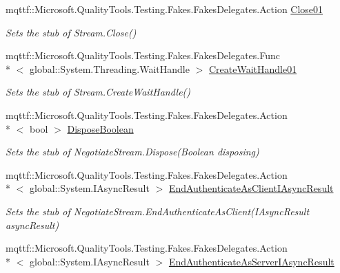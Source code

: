 \begin{DoxyCompactItemize}
mqttf\-::\-Microsoft.\-Quality\-Tools.\-Testing.\-Fakes.\-Fakes\-Delegates.\-Action \hyperlink{class_system_1_1_net_1_1_security_1_1_fakes_1_1_stub_negotiate_stream_a674e846a4fe168b20497d6c799c6b016}{Close01}
\begin{DoxyCompactList}\small\item\em Sets the stub of Stream.\-Close()\end{DoxyCompactList}\item 
mqttf\-::\-Microsoft.\-Quality\-Tools.\-Testing.\-Fakes.\-Fakes\-Delegates.\-Func\\*
$<$ global\-::\-System.\-Threading.\-Wait\-Handle $>$ \hyperlink{class_system_1_1_net_1_1_security_1_1_fakes_1_1_stub_negotiate_stream_a06a01a60f2c3f2edb6f3bde17c061f60}{Create\-Wait\-Handle01}
\begin{DoxyCompactList}\small\item\em Sets the stub of Stream.\-Create\-Wait\-Handle()\end{DoxyCompactList}\item 
mqttf\-::\-Microsoft.\-Quality\-Tools.\-Testing.\-Fakes.\-Fakes\-Delegates.\-Action\\*
$<$ bool $>$ \hyperlink{class_system_1_1_net_1_1_security_1_1_fakes_1_1_stub_negotiate_stream_af6eea24d04abfe0df6f3249e8b44c98e}{Dispose\-Boolean}
\begin{DoxyCompactList}\small\item\em Sets the stub of Negotiate\-Stream.\-Dispose(\-Boolean disposing)\end{DoxyCompactList}\item 
mqttf\-::\-Microsoft.\-Quality\-Tools.\-Testing.\-Fakes.\-Fakes\-Delegates.\-Action\\*
$<$ global\-::\-System.\-I\-Async\-Result $>$ \hyperlink{class_system_1_1_net_1_1_security_1_1_fakes_1_1_stub_negotiate_stream_a163994dac012b079b336de85e95c88ca}{End\-Authenticate\-As\-Client\-I\-Async\-Result}
\begin{DoxyCompactList}\small\item\em Sets the stub of Negotiate\-Stream.\-End\-Authenticate\-As\-Client(\-I\-Async\-Result async\-Result)\end{DoxyCompactList}\item 
mqttf\-::\-Microsoft.\-Quality\-Tools.\-Testing.\-Fakes.\-Fakes\-Delegates.\-Action\\*
$<$ global\-::\-System.\-I\-Async\-Result $>$ \hyperlink{class_system_1_1_net_1_1_security_1_1_fakes_1_1_stub_negotiate_stream_ac0f944a3be477c9e91fa3feacc2a5a0e}{End\-Authenticate\-As\-Server\-I\-Async\-Result}

\end{DoxyCompactItemize}
